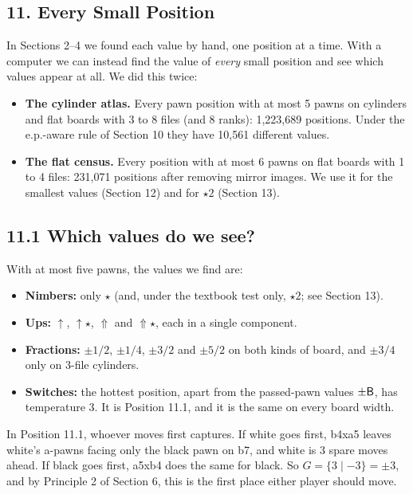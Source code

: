\begin{center}
\section*{11. Every Small Position}
\end{center}

\indent \indent In Sections 2--4 we found each value by hand, one position at a time. With a computer we can
instead find the value of \emph{every} small position and see which values appear at all. We did this twice:
\begin{itemize}
\item \textbf{The cylinder atlas.} Every pawn position with at most 5 pawns on cylinders and flat boards with 3 to
  8 files (and 8 ranks): 1,223,689 positions. Under the e.p.-aware rule of Section 10 they have 10,561 different
  values.
\item \textbf{The flat census.} Every position with at most 6 pawns on flat boards with 1 to 4 files: 231,071
  positions after removing mirror images. We use it for the smallest values (Section 12) and for $\star2$
  (Section 13).
\end{itemize}

\subsection*{11.1 Which values do we see?}

\indent With at most five pawns, the values we find are:
\begin{itemize}
\item \textbf{Nimbers:} only $\star$ (and, under the textbook test only, $\star2$; see Section 13).
\item \textbf{Ups:} $\uparrow$, $\uparrow\star$, $\Uparrow$ and $\Uparrow\star$, each in a single component.
\item \textbf{Fractions:} $\pm1/2$, $\pm1/4$, $\pm3/2$ and $\pm5/2$ on both kinds of board, and $\pm3/4$ only on
  3-file cylinders.
\item \textbf{Switches:} the hottest position, apart from the passed-pawn values $\pm\mathsf{B}$, has temperature 3. It is
  Position 11.1, and it is the same on every board width.
\end{itemize}


\indent In Position 11.1, whoever moves first captures. If white goes first, b4xa5 leaves white's a-pawns facing
only the black pawn on b7, and white is 3 spare moves ahead. If black goes first, a5xb4 does the same for black.
So $G = \{3 \mid -3\} = \pm3$, and by Principle 2 of Section 6, this is the first place either player should move.

